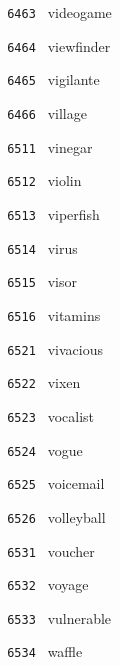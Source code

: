 \documentclass[11pt]{article}
\begin{document}
\begin{multicols}{6}
\noindent \texttt{ 6463 } \hspace{1mm} videogame  \par
\noindent \texttt{ 6464 } \hspace{1mm} viewfinder  \par
\noindent \texttt{ 6465 } \hspace{1mm} vigilante  \par
\noindent \texttt{ 6466 } \hspace{1mm} village  \par
\noindent \texttt{ 6511 } \hspace{1mm} vinegar  \par
\noindent \texttt{ 6512 } \hspace{1mm} violin  \par
\noindent \texttt{ 6513 } \hspace{1mm} viperfish  \par
\noindent \texttt{ 6514 } \hspace{1mm} virus  \par
\noindent \texttt{ 6515 } \hspace{1mm} visor  \par
\noindent \texttt{ 6516 } \hspace{1mm} vitamins  \par
\noindent \texttt{ 6521 } \hspace{1mm} vivacious  \par
\noindent \texttt{ 6522 } \hspace{1mm} vixen  \par
\noindent \texttt{ 6523 } \hspace{1mm} vocalist  \par
\noindent \texttt{ 6524 } \hspace{1mm} vogue  \par
\noindent \texttt{ 6525 } \hspace{1mm} voicemail  \par
\noindent \texttt{ 6526 } \hspace{1mm} volleyball  \par
\noindent \texttt{ 6531 } \hspace{1mm} voucher  \par
\noindent \texttt{ 6532 } \hspace{1mm} voyage  \par
\noindent \texttt{ 6533 } \hspace{1mm} vulnerable  \par
\noindent \texttt{ 6534 } \hspace{1mm} waffle  \par

\end{multicols}
\end{document}
